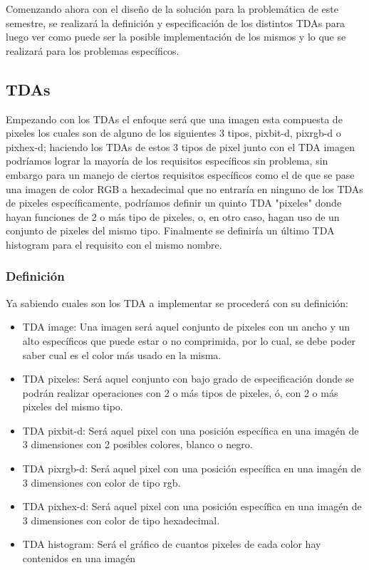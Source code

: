 Comenzando ahora con el diseño de la solución para la problemática de este semestre, se realizará la definición y especificación
de los distintos TDAs para luego ver como puede ser la posible implementación de los mismos y lo que se realizará para los problemas
específicos.

\subsection{TDAs}
 Empezando con los TDAs el enfoque será que una imagen esta compuesta de pixeles los cuales
  son de alguno de los siguientes 3 tipos, pixbit-d, pixrgb-d o pixhex-d; haciendo los TDAs de estos 3 tipos
  de pixel junto con el TDA imagen podríamos lograr la mayoría de los requisitos específicos sin problema, sin 
  embargo para un manejo de ciertos requisitos específicos como el de que se pase una imagen de color RGB a hexadecimal
  que no entraría en ninguno de los TDAs de pixeles específicamente, podríamos definir un quinto TDA "pixeles" donde hayan
  funciones de 2 o más tipo de pixeles, o, en otro caso, hagan uso de un conjunto de pixeles del mismo tipo. Finalmente se definiría
  un último TDA histogram para el requisito con el mismo nombre.\\

  \subsubsection{Definición}
    Ya sabiendo cuales son los TDA a implementar se procederá con su definición:
    \begin{itemize}
      \item TDA image: Una imagen será aquel conjunto de pixeles con un ancho y un alto específicos
        que puede estar o no comprimida, por lo cual, se debe poder saber cual es el color más usado en la misma.
      \item TDA pixeles: Será aquel conjunto con bajo grado de especificación donde se podrán realizar operaciones con 2 o más tipos de pixeles, ó,
        con 2 o más pixeles del mismo tipo.
      \item TDA pixbit-d: Será aquel pixel con una posición específica en una imagén de 3 dimensiones con 2 posibles colores, blanco o negro.
      \item TDA pixrgb-d: Será aquel pixel con una posición específica en una imagén de 3 dimensiones con color de tipo rgb.
      \item TDA pixhex-d: Será aquel pixel con una posición específica en una imagén de 3 dimensiones con color de tipo hexadecimal.
      \item TDA histogram: Será el gráfico de cuantos pixeles de cada color hay contenidos en una imagén
    \end{itemize}

